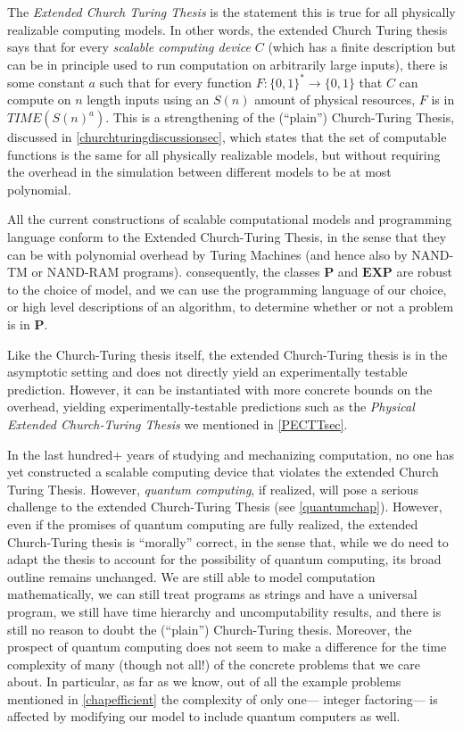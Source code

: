 The \emph{Extended Church Turing Thesis} is the statement this is true
for all physically realizable computing models. In other words, the
extended Church Turing thesis says that for every \emph{scalable
computing device} \(C\) (which has a finite description but can be in
principle used to run computation on arbitrarily large inputs), there is
some constant \(a\) such that for every function
\(F:\{0,1\}^* \rightarrow \{0,1\}\) that \(C\) can compute on \(n\)
length inputs using an \(S(n)\) amount of physical resources, \(F\) is
in \(\ensuremath{\mathit{TIME}}(S(n)^a)\). This is a strengthening of
the (``plain'') Church-Turing Thesis, discussed in
\cref{churchturingdiscussionsec}, which states that the set of
computable functions is the same for all physically realizable models,
but without requiring the overhead in the simulation between different
models to be at most polynomial.

All the current constructions of scalable computational models and
programming language conform to the Extended Church-Turing Thesis, in
the sense that they can be with polynomial overhead by Turing Machines
(and hence also by NAND-TM or NAND-RAM programs). consequently, the
classes \(\mathbf{P}\) and \(\mathbf{EXP}\) are robust to the choice of
model, and we can use the programming language of our choice, or high
level descriptions of an algorithm, to determine whether or not a
problem is in \(\mathbf{P}\).

Like the Church-Turing thesis itself, the extended Church-Turing thesis
is in the asymptotic setting and does not directly yield an
experimentally testable prediction. However, it can be instantiated with
more concrete bounds on the overhead, yielding experimentally-testable
predictions such as the \emph{Physical Extended Church-Turing Thesis} we
mentioned in \cref{PECTTsec}.

In the last hundred+ years of studying and mechanizing computation, no
one has yet constructed a scalable computing device that violates the
extended Church Turing Thesis. However, \emph{quantum computing}, if
realized, will pose a serious challenge to the extended Church-Turing
Thesis (see \cref{quantumchap}). However, even if the promises of
quantum computing are fully realized, the extended Church-Turing thesis
is ``morally'' correct, in the sense that, while we do need to adapt the
thesis to account for the possibility of quantum computing, its broad
outline remains unchanged. We are still able to model computation
mathematically, we can still treat programs as strings and have a
universal program, we still have time hierarchy and uncomputability
results, and there is still no reason to doubt the (``plain'')
Church-Turing thesis. Moreover, the prospect of quantum computing does
not seem to make a difference for the time complexity of many (though
not all!) of the concrete problems that we care about. In particular, as
far as we know, out of all the example problems mentioned in
\cref{chapefficient} the complexity of only one--- integer factoring---
is affected by modifying our model to include quantum computers as well.

